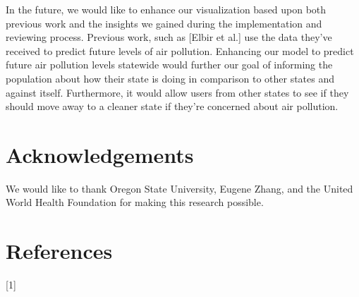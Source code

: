 \documentclass[journal]{vgtc}                %
\begin{document}
In the future, we would like to enhance our visualization based upon both previous work and the insights we gained during
the implementation and reviewing process. Previous work, such as [Elbir et al.] use the data they've received to predict future
levels of air pollution. Enhancing our model to predict future air pollution levels statewide would further our goal of informing
the population about how their state is doing in comparison to other states and against itself. Furthermore, it would allow
users from other states to see if they should move away to a cleaner state if they're concerned about air pollution. 

\section{Acknowledgements}

We would like to thank Oregon State University, Eugene Zhang, and the United World Health Foundation for
making this research possible.

\section{References}
[1] 
\end{document}
